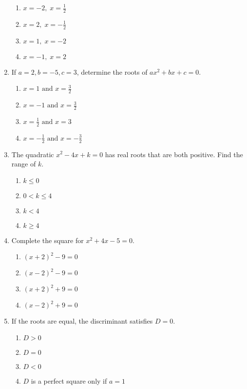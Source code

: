 \documentclass[12pt]{article}
\begin{document}
\begin{enumerate}
\begin{enumerate}
  \item \(x = -2,\; x = \tfrac{1}{2}\)
  \item \(x = 2,\; x = -\tfrac{1}{2}\)
  \item \(x = 1,\; x = -2\)
  \item \(x = -1,\; x = 2\)
\end{enumerate}

\item If \(a = 2, b = -5, c = 3\), determine the roots of \(ax^2 + bx + c = 0\).

\begin{enumerate}
  \item \(x = 1\text{ and }x = \tfrac{3}{2}\)
  \item \(x = -1\text{ and }x = \tfrac{3}{2}\)
  \item \(x = \tfrac{1}{2}\text{ and }x = 3\)
  \item \(x = -\tfrac{1}{2}\text{ and }x = -\tfrac{3}{2}\)
\end{enumerate}

\item The quadratic \(x^2 - 4x + k = 0\) has real roots that are both positive. Find the range of \(k\).

\begin{enumerate}
  \item \(k \le 0\)
  \item \(0 < k \le 4\)
  \item \(k < 4\)
  \item \(k \ge 4\)
\end{enumerate}

\item Complete the square for \(x^2 + 4x - 5 = 0\).

\begin{enumerate}
  \item \((x+2)^2 - 9 = 0\)
  \item \((x-2)^2 - 9 = 0\)
  \item \((x+2)^2 + 9 = 0\)
  \item \((x-2)^2 + 9 = 0\)
\end{enumerate}

\item If the roots are equal, the discriminant satisfies \(D = 0\).

\begin{enumerate}
  \item \(D > 0\)
  \item \(D = 0\)
  \item \(D < 0\)
  \item \(D\) is a perfect square only if \(a = 1\)
\end{enumerate}


\end{enumerate}
\end{document}
